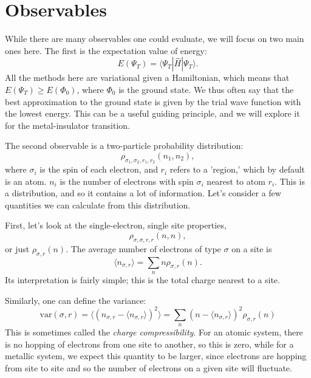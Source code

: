 \documentclass[12pt]{article}
\begin{document}
\section*{Observables}

While there are many observables one could evaluate, we will focus on two main ones here.
The first is the expectation value of energy: 
\begin{equation} 	
E(\Psi_T) = \langle \Psi_T | \hat{H} | \Psi_T \rangle. 
\end{equation}
All the methods here are variational given a Hamiltonian, which means that $E(\Psi_T) \geq E(\Phi_0)$, where $\Phi_0$ is the ground state.
We thus often say that the best approximation to the ground state is given by the trial wave function with the lowest energy.
This can be a useful guiding principle, and we will explore it for the metal-insulator transition.

The second observable is a two-particle probability distribution:
\begin{equation}
\rho_{\sigma_1,\sigma_2,r_1,r_2}(n_1,n_2),	
\end{equation}
where $\sigma_i$ is the spin of each electron, and $r_i$ refers to a 'region,' which by default is an atom.
$n_i$ is the number of electrons with spin $\sigma_i$ nearest to atom $r_i$.
This is a distribution, and so it contains a lot of information.
Let's consider a few quantities we can calculate from this distribution.

First, let's look at the single-electron, single site properties, 
\begin{equation}
\rho_{\sigma,\sigma,r,r}(n,n),	
\end{equation}
or just $\rho_{\sigma,r}(n)$.
The average number of electrons of type $\sigma$ on a site is 
\begin{equation}
\langle n_{\sigma,r} \rangle = \sum_n n \rho_{\sigma,r} (n).
\end{equation}
Its interpretation is fairly simple; this is the total charge nearest to a site.

Similarly, one can define the variance:
\begin{equation}
\text{var}(\sigma,r) = \langle (n_{\sigma,r}-\langle n_{\sigma,r}\rangle)^2 \rangle = \sum_n (n-\langle n_{\sigma,r}\rangle)^2 \rho_{\sigma,r} (n)
\end{equation}
This is sometimes called the {\it charge compressibility}.
For an atomic system, there is no hopping of electrons from one site to another, so this is zero, while for a metallic system, we expect this quantity to be larger, since electrons are hopping from site to site and so the number of electrons on a given site will fluctuate.
\end{document}
